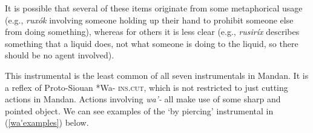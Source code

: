 It is possible that several of these items originate from some metaphorical usage (e.g., \textit{ruxók} involving someone holding up their hand to prohibit someone else from doing something), whereas for others it is less clear (e.g., \textit{rusiríx} describes something that a liquid does, not what someone is doing to the liquid, so there should be no agent involved).

\label{ParaByPiercing}

This instrumental is the least common of all seven instrumentals in Mandan. It is a reflex of Proto-Siouan *Wa- \textsc{ins.cut}, which is not restricted to just cutting actions in Mandan. Actions involving \textit{wa'-} all make use of some sharp and pointed object. We can see examples of the `by piercing' instrumental in (\ref{wa'examples}) below. 

